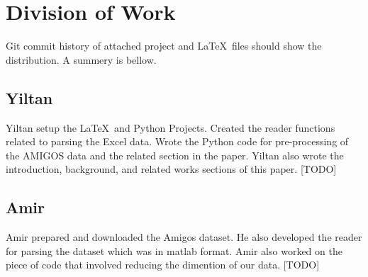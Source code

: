 \section{Division of Work}
\label{sec:division_of_work}
Git commit history of attached project and
\LaTeX~files should show the distribution.
A summery is bellow.

\subsection{Yiltan}
Yiltan setup the \LaTeX~and Python Projects.
Created the reader functions related to parsing the Excel data.
Wrote the Python code for pre-processing of the AMIGOS data
and the related section in the paper.
Yiltan also wrote the introduction, background, and related works
sections of this paper.
[TODO]

\subsection{Amir}
Amir prepared and downloaded the Amigos dataset.
He also developed the reader for parsing the dataset
which was in matlab format.
Amir also worked on the piece of code that involved reducing the dimention of our data.
[TODO]
